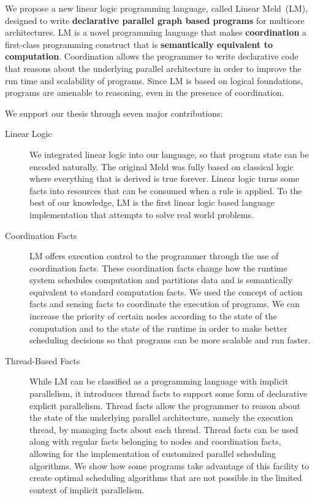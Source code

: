 
We propose a new linear logic programming language, called Linear Meld~(LM),
designed to write \textbf{declarative parallel graph based programs} for
multicore architectures. LM is a novel programming language that makes
\textbf{coordination} a first-class programming construct that is
\textbf{semantically equivalent to computation}. Coordination allows the
programmer to write declarative code that reasons about the underlying parallel
architecture in order to improve the run time and scalability of programs. Since
LM is based on logical foundations, programs are amenable to reasoning, even in
the presence of coordination.

We support our thesis through seven major contributions:

\begin{description}
   
   \item[Linear Logic]

   We integrated linear logic into our language, so that program state can be
   encoded naturally. The original Meld was fully based on classical logic where
   everything that is derived is true forever. Linear logic turns some facts
   into resources that can be consumed when a rule is applied.  To the best of
   our knowledge, LM is the first linear logic based language implementation
   that attempts to solve real world problems.

   \item[Coordination Facts]
   
   LM offers execution control to the programmer through the use of coordination
   facts. These coordination facts change how the runtime system schedules
   computation and partitions data and is semantically equivalent to standard
   computation facts. We used the concept of action facts and sensing facts to
   coordinate the execution of programs. We can increase the priority of certain
   nodes according to the state of the computation and to the state of the
   runtime in order to make better scheduling decisions so that programs can be
   more scalable and run faster.

   \item[Thread-Based Facts]

   While LM can be classified as a programming language with implicit
   parallelism, it introduces thread facts to support some form of declarative explicit
   parallelism. Thread facts allow the programmer to reason about the state of
   the underlying parallel architecture, namely the execution thread, by
   managing facts about each thread. Thread facts can be used along with regular
   facts belonging to nodes and coordination facts, allowing for the
   implementation of customized parallel scheduling algorithms. We show how some
   programs take advantage of this facility to create optimal scheduling
   algorithms that are not possible in the limited context of implicit
   parallelism.
   

\end{description}
